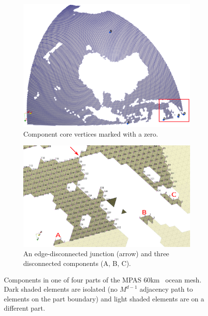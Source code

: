 \begin{figure} [H] \centering
  \begin{subfigure}{\textwidth}
    \includegraphics[width=\textwidth]{figs/compDist/p2core.eps}
    \caption{Component core vertices marked with a zero.}
    \label{fig:oceanComps}
  \end{subfigure}
  \begin{subfigure}{.8\textwidth}
    \includegraphics[width=\textwidth]{figs/compDist/p2distComps_nocolor.eps}
    \caption{
      An edge-disconnected junction (arrow) and three disconnected components
      (A, B, C).
    }
    \label{fig:oceanDist}
  \end{subfigure}
  \caption[Components in one of four parts of the MPAS 60km ocean mesh.] {
    Components in one of four parts of the MPAS 60km~\cite{climateMesh} ocean
    mesh.
    Dark shaded elements are isolated (no $M^{d-1}$ adjacency path to elements
    on the part boundary) and light shaded elements are on a different part.
  }
  \label{fig:oceanTopoDist}
\end{figure}

